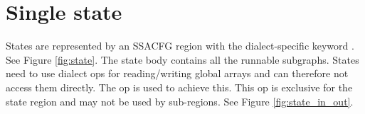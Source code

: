 \section{Single state}
States are represented by an SSACFG region with the dialect-specific keyword . See Figure \ref{fig:state}. The state body contains all the runnable subgraphs. States need to use dialect ops for reading/writing global arrays and can therefore not access them directly.
The op  is used to achieve this. This op is exclusive for the state region and may not be used by sub-regions. See Figure \ref{fig:state_in_out}.

